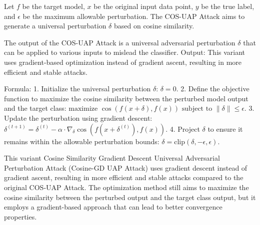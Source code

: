 Let \( f \) be the target model, \( x \) be the original input data point, \( y \) be the true label, and \( \epsilon \) be the maximum allowable perturbation. The COS-UAP Attack aims to generate a universal perturbation \( \delta \) based on cosine similarity.

The output of the COS-UAP Attack is a universal adversarial perturbation \( \delta \) that can be applied to various inputs to mislead the classifier.
Output: This variant uses gradient-based optimization instead of gradient ascent, resulting in more efficient and stable attacks. 

Formula:
1. Initialize the universal perturbation \( \delta \):
   $
   \delta = 0.
   $
2. Define the objective function to maximize the cosine similarity between the perturbed model output and the target class:
   $
   \text{maximize } \cos(f(x + \delta), f(x)) \text{ subject to } \|\delta\| \leq \epsilon.
   $
3. Update the perturbation using gradient descent:
   $
   \delta^{(t+1)} = \delta^{(t)} - \alpha \cdot \nabla_{\delta} \cos(f(x + \delta^{(t)}), f(x)).
   $
4. Project \( \delta \) to ensure it remains within the allowable perturbation bounds:
   $
   \delta = \text{clip}(\delta, -\epsilon, \epsilon).
   $

This variant Cosine Similarity Gradient Descent Universal Adversarial Perturbation Attack (Cosine-GD UAP Attack) uses gradient descent instead of gradient ascent, resulting in more efficient and stable attacks compared to the original COS-UAP Attack. The optimization method still aims to maximize the cosine similarity between the perturbed output and the target class output, but it employs a gradient-based approach that can lead to better convergence properties.